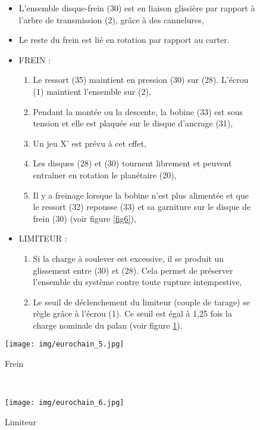\newpage

\begin{figure}[!h]
\begin{minipage}{0.48\linewidth}
\begin{itemize}
 \item L'ensemble disque-frein (30) est en liaison glissière par rapport à l'arbre de transmission (2), grâce à des cannelures,
 \item Le reste du frein est lié en rotation  par rapport au carter.
 \item FREIN :
 \begin{enumerate}
  \item Le ressort (35) maintient en pression (30) sur (28). L'écrou (1) maintient l'ensemble sur (2),
 \item Pendant la montée ou la descente, la bobine (33) est sous tension et elle est plaquée sur le disque d'ancrage (31),
 \item Un jeu X' est prévu à cet effet,
 \item Les disques (28) et (30) tournent librement et peuvent entraîner en rotation le planétaire (20),
 \item Il y a freinage lorsque la bobine n'est plus alimentée et que le ressort (32) repousse (33) et sa garniture sur le disque de frein (30) (voir figure \ref{fig6}),
 \end{enumerate}
 \item LIMITEUR :
 \begin{enumerate}
 \item Si la charge à soulever est excessive, il se produit un glissement entre (30) et (28). Cela permet de préserver l'ensemble du système contre toute rupture intempestive,
 \item Le seuil de déclenchement du limiteur (couple de tarage) se règle grâce à l'écrou (1). Ce seuil est égal à 1,25 fois la charge nominale du palan 
(voir figure \ref{fig7}).
 \end{enumerate}
 \end{itemize}
\end{minipage}
 \hfill
\begin{minipage}{0.5\linewidth}
\centering\texttt{[image: img/eurochain\_5.jpg]}
  \caption{\label{fig6}Frein}
 

 ~\
 
 \centering\texttt{[image: img/eurochain\_6.jpg]}
 \caption{\label{fig7}Limiteur}
\end{minipage}
\end{figure}

